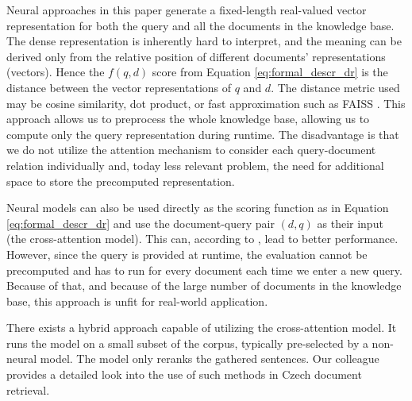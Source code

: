Neural approaches in this paper generate a fixed-length real-valued vector representation for both the query and all the documents in the knowledge base.
The dense representation is inherently hard to interpret, and the meaning can be derived only from the relative position of different documents' representations (vectors).
Hence the $f(q,d)$ score from Equation \ref{eq:formal_descr_dr} is the distance between the vector representations of $q$ and $d$.
The distance metric used may be cosine similarity, dot product, or fast approximation such as FAISS \citep{faiss}.
This approach allows us to preprocess the whole knowledge base, allowing us to compute only the query representation during runtime.
The disadvantage is that we do not utilize the attention mechanism to consider each query-document relation individually and, today less relevant problem, the need for additional space to store the precomputed representation.

Neural models can also be used directly as the scoring function as in Equation \ref{eq:formal_descr_dr} and use the document-query pair $(d,q)$ as their input (the cross-attention model).
This can, according to \citet{two-tower}, lead to better performance. However, since the query is provided at runtime, the evaluation cannot be precomputed and has to run for every document each time we enter a new query.
Because of that, and because of the large number of documents in the knowledge base, this approach is unfit for real-world application.

There exists a hybrid approach capable of utilizing the cross-attention model. 
It runs the model on a small subset of the corpus, typically pre-selected by a non-neural model.
The model only reranks the gathered sentences.
Our colleague \citet{dedkova} provides a detailed look into the use of such methods in Czech document retrieval.




